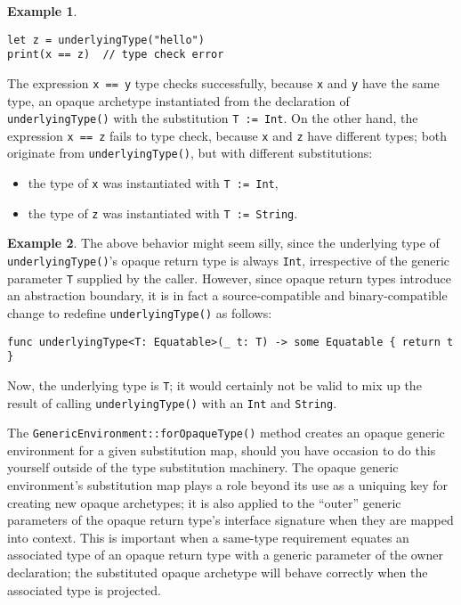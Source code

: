 \documentclass[a4paper,headsepline,bibliography=totoc,toc=flat,fleqn,twoside=semi]{scrbook}
\theoremstyle{definition}
\theoremstyle{definition}
\newtheorem{example}{Example}[chapter]
\theoremstyle{definition}
\begin{document}
\begin{example}
\begin{Verbatim}
let z = underlyingType("hello")
print(x == z)  // type check error
\end{Verbatim}
The expression \texttt{x == y} type checks successfully, because \texttt{x} and \texttt{y} have the same type, an opaque archetype instantiated from the declaration of \texttt{underlyingType()} with the substitution \texttt{T := Int}. On the other hand, the expression \texttt{x == z} fails to type check, because \texttt{x} and \texttt{z} have different types; both originate from \texttt{underlyingType()}, but with different substitutions:
\begin{itemize}
\item the type of \texttt{x} was instantiated with \texttt{T := Int},
\item the type of \texttt{z} was instantiated with \texttt{T := String}.
\end{itemize}
\end{example}
\begin{example}
The above behavior might seem silly, since the underlying type of \texttt{underlyingType()}'s opaque return type is always \texttt{Int}, irrespective of the generic parameter \texttt{T} supplied by the caller. However, since opaque return types introduce an abstraction boundary, it is in fact a source-compatible and binary-compatible change to redefine \texttt{underlyingType()} as follows:
\begin{Verbatim}
func underlyingType<T: Equatable>(_ t: T) -> some Equatable { return t }
\end{Verbatim}
Now, the underlying type is \texttt{T}; it would certainly not be valid to mix up the result of calling \texttt{underlyingType()} with an \texttt{Int} and \texttt{String}.
\end{example}

The \texttt{GenericEnvironment::forOpaqueType()} method creates an opaque generic environment for a given substitution map, should you have occasion to do this yourself outside of the type substitution machinery. The opaque generic environment's substitution map plays a role beyond its use as a uniquing key for creating new opaque archetypes; it is also applied to the ``outer'' generic parameters of the opaque return type's interface signature when they are mapped into context. This is important when a same-type requirement equates an associated type of an opaque return type with a generic parameter of the owner declaration; the substituted opaque archetype will behave correctly when the associated type is projected.
\end{document}
